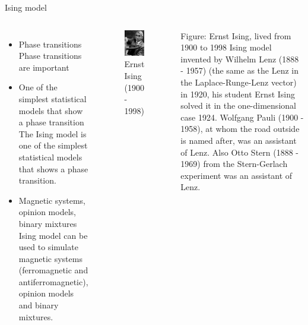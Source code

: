 \documentclass[handout]{beamer}
\begin{document}
\begin{frame}{Ising model}
\begin{columns}[c]
	\begin{itemize}
		\item<2-> Phase transitions
			 {Phase transitions are important}
		\item<3-> One of the simplest statistical models that show a phase transition
			 {The Ising model is one of the simplest statistical models that shows a phase transition.}
		\item<4-> Magnetic systems, opinion models, binary mixtures
			 {Ising model can be used to simulate magnetic systems (ferromagnetic and antiferromagnetic), opinion models and binary mixtures.}
	\end{itemize}
	\pause[5]
	\begin{figure}[p]
		\centering
		\includegraphics{img/ising.jpg}
		\caption{Ernst Ising (1900 - 1998)}
		\label{fig:awesome_image}
	\end{figure}
	 {Figure: Ernst Ising, lived from 1900 to 1998}
	 {Ising model invented by Wilhelm Lenz (1888 - 1957) (the same as the Lenz in the Laplace-Runge-Lenz vector) in 1920, his student Ernst Ising solved it in the one-dimensional case 1924.}
	 {Wolfgang Pauli (1900 - 1958), at whom the road outside is named after, was an assistant of Lenz.}
	 {Also Otto Stern (1888 - 1969) from the Stern-Gerlach experiment was an assistant of Lenz.}
\end{columns}
\end{frame}
\end{document}
